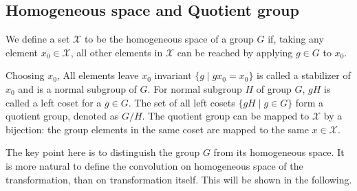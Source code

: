 \documentclass{IEEEtran}
\newcommand{\calx}{\mathcal{X}}
\begin{document}
\subsection*{Homogeneous space and Quotient group}
We define a set $\calx$ to be the homogeneous space of a group $G$ if, taking any element $x_0\in \calx$,
all other elements in $\calx$ can be reached by applying $g\in G$ to $x_0$. 

Choosing $x_0$, All elements leave $x_0$ invariant $\{g\mid gx_0 = x_0\}$ is called a stabilizer of $x_0$ and is 
a normal subgroup of $G$. 
For normal subgroup $H$ of group $G$, $gH$ is called a left coset for a $g\in G$. 
The set of all left cosets $\{gH\mid g \in G\}$ form a quotient group, denoted as $G/H$.
The quotient group can be mapped to $\calx$ by a bijection: 
the group elements in the same coset are mapped to the same $x\in \calx$.

The key point here is to distinguish the group $G$ from its homogeneous space. It is more natural to define 
the convolution on homogeneous space of the transformation, than on transformation itself. This will be 
shown in the following.
\end{document}

